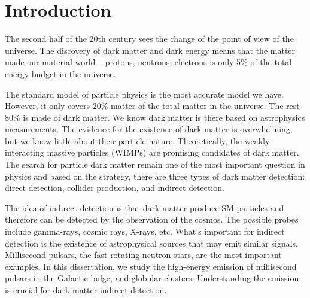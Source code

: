 \documentclass[doublespace,nopageskip]{VTthesis} %
\begin{document}



\mainmatter

\chapter{Introduction} \label{ch:introduction}

The second half of the 20th century sees the change of the point of view of the universe. The discovery of dark matter and dark energy means that the matter made our material world -- protons, neutrons, electrons is only 5\% of the total energy budget in the universe.

The standard model of particle physics is the most accurate model we have. However, it only covers 20\% matter of the total matter in the universe. The rest 80\% is made of dark matter. We know dark matter is there based on astrophysics measurements. The evidence for the existence of dark matter is overwhelming, but we know little about their particle nature. Theoretically, the weakly interacting massive particles (WIMPs) are promising candidates of dark matter. The search for particle dark matter remain one of the most important question in physics and based on the strategy, there are three types of dark matter detection: direct detection, collider production, and indirect detection.

The idea of indirect detection is that dark matter produce SM particles and therefore can be detected by the observation of the cosmos. The possible probes include gamma-rays, cosmic rays, X-rays, etc. What's important for indirect detection is the existence of astrophysical sources that may emit similar signals. Millisecond pulsars, the fast rotating neutron stars, are the most important examples. In this dissertation, we study the high-energy emission of millisecond pulsars in the Galactic bulge, and globular clusters. Understanding the emission is crucial for dark matter indirect detection.
\end{document}
